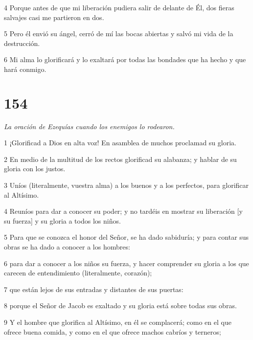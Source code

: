 \par 4 Porque antes de que mi liberación pudiera salir de delante de Él, dos fieras salvajes casi me partieron en dos.

\par 5 Pero él envió su ángel, cerró de mí las bocas abiertas y salvó mi vida de la destrucción.

\par 6 Mi alma lo glorificará y lo exaltará por todas las bondades que ha hecho y que hará conmigo.

\chapter{154}

\par \textit{La oración de Ezequías cuando los enemigos lo rodearon.}

\par 1 ¡Glorificad a Dios en alta voz! En asamblea de muchos proclamad su gloria.

\par 2 En medio de la multitud de los rectos glorificad su alabanza; y hablar de su gloria con los justos.

\par 3 Uníos (literalmente, vuestra alma) a los buenos y a los perfectos, para glorificar al Altísimo.

\par 4 Reuníos para dar a conocer su poder; y no tardéis en mostrar su liberación [y su fuerza] y su gloria a todos los niños.

\par 5 Para que se conozca el honor del Señor, se ha dado sabiduría; y para contar sus obras se ha dado a conocer a los hombres:

\par 6 para dar a conocer a los niños su fuerza, y hacer comprender su gloria a los que carecen de entendimiento (literalmente, corazón);

\par 7 que están lejos de sus entradas y distantes de sus puertas:

\par 8 porque el Señor de Jacob es exaltado y su gloria está sobre todas sus obras.

\par 9 Y el hombre que glorifica al Altísimo, en él se complacerá; como en el que ofrece buena comida, y como en el que ofrece machos cabríos y terneros;

